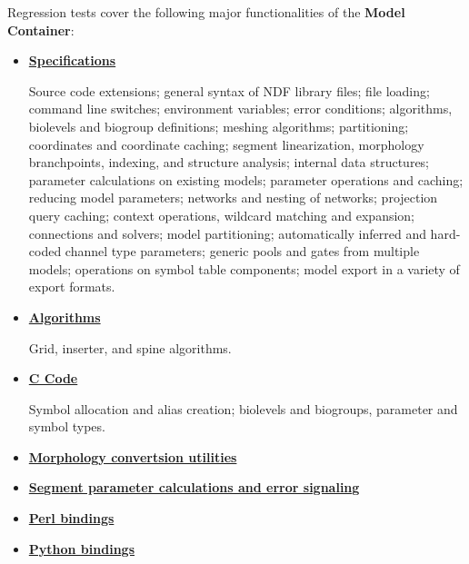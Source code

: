\documentclass[12pt]{article}
\begin{document}
Regression tests cover the following major functionalities of the {\bf Model\,Container}:
\begin{itemize}

\item[]\href{http://neurospaces.sourceforge.net/neurospaces_project/neurospaces/tests/html/specifications/main.html}{\bf Specifications}

Source code extensions; general syntax of NDF library files; file loading; command line switches; environment variables; error conditions;  algorithms, biolevels and biogroup definitions; meshing algorithms; partitioning; coordinates and coordinate caching;  segment linearization, morphology branchpoints, indexing, and structure analysis; internal data structures; parameter calculations on existing models; parameter operations and caching; reducing model parameters; networks and nesting of networks; projection query caching; context operations, wildcard matching and expansion; connections and solvers; model partitioning; automatically inferred and hard-coded channel type parameters;  generic pools and gates from multiple models; operations on symbol table components; model export in a variety of export formats.

\item[]\href{http://neurospaces.sourceforge.net/neurospaces_project/neurospaces/tests/html/specifications/algorithms/main.html}{\bf Algorithms}

Grid, inserter, and spine algorithms.

\item[]\href{http://neurospaces.sourceforge.net/neurospaces_project/neurospaces/tests/html/specifications/code/main.html}{\bf C Code}

Symbol allocation and alias creation; biolevels and biogroups, parameter and symbol types. 

\item[]\href{http://neurospaces.sourceforge.net/neurospaces_project/neurospaces/tests/html/specifications/convertors/main.html}{\bf Morphology convertsion utilities}

\item[]\href{http://neurospaces.sourceforge.net/neurospaces_project/neurospaces/tests/html/specifications/parameters/main.html}{\bf Segment parameter calculations and error signaling}

\item[]\href{http://neurospaces.sourceforge.net/neurospaces_project/neurospaces/tests/html/specifications/perl/main.html}{\bf Perl bindings}

\item[]\href{http://neurospaces.sourceforge.net/neurospaces_project/neurospaces/tests/html/specifications/python/main.html}{\bf Python bindings}

\end{itemize}
\end{document}
